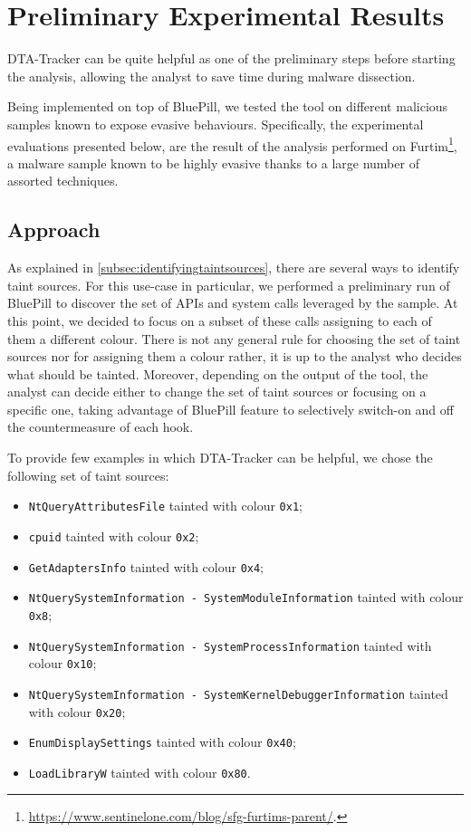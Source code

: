 \documentclass[LaM,binding=0.6cm]{sapthesis}
\begin{document}
\section{Preliminary Experimental Results}
\label{sec:evaluations}
{\sf DTA-Tracker} can be quite helpful as one of the preliminary steps before starting the analysis, allowing the analyst to save time during malware dissection.

Being implemented on top of BluePill, we tested the tool on different malicious samples known to expose evasive behaviours. Specifically, the experimental evaluations presented below, are the result of the analysis performed on Furtim\footnote{\url{https://www.sentinelone.com/blog/sfg-furtims-parent/}.}, a malware sample known to be highly evasive thanks to a large number of assorted techniques.

\subsection{Approach}
As explained in \autoref{subsec:identifyingtaintsources}, there are several ways to identify taint sources. For this use-case in particular, we performed a preliminary run of BluePill to discover the set of APIs and system calls leveraged by the sample. At this point, we decided to focus on a subset of these calls assigning to each of them a different colour. There is not any general rule for choosing the set of taint sources nor for assigning them a colour rather, it is up to the analyst who decides what should be tainted. Moreover, depending on the output of the tool, the analyst can decide either to change the set of taint sources or focusing on a specific one, taking advantage of BluePill feature to selectively switch-on and off the countermeasure of each hook.

To provide few examples in which {\sf DTA-Tracker} can be helpful, we chose the following set of taint sources:
\begin{itemize}
\item \texttt{NtQueryAttributesFile} tainted with colour \texttt{0x1};
\item \texttt{cpuid} tainted with colour \texttt{0x2};
\item \texttt{GetAdaptersInfo} tainted with colour \texttt{0x4};
\item \texttt{NtQuerySystemInformation - SystemModuleInformation} tainted with colour \texttt{0x8};
\item \texttt{NtQuerySystemInformation - SystemProcessInformation} tainted with colour \texttt{0x10};
\item \texttt{NtQuerySystemInformation - SystemKernelDebuggerInformation} tainted with colour \texttt{0x20};
\item \texttt{EnumDisplaySettings} tainted with colour \texttt{0x40};
\item \texttt{LoadLibraryW} tainted with colour \texttt{0x80}.
\end{itemize}
\newpage
\end{document}
